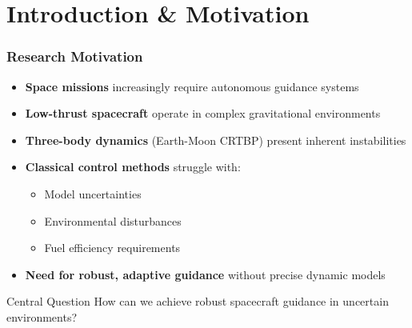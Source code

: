 \section{Introduction \& Motivation}

\begin{frame}
    \frametitle{Research Motivation}
    \vspace{-0.5cm}

    \begin{itemize}
        \item \textbf{Space missions} increasingly require autonomous guidance systems
        \item \textbf{Low-thrust spacecraft} operate in complex gravitational environments
        \item \textbf{Three-body dynamics} (Earth-Moon CRTBP) present inherent instabilities
        \item \textbf{Classical control methods} struggle with:
        \begin{itemize}
            \item Model uncertainties
            \item Environmental disturbances
            \item Fuel efficiency requirements
        \end{itemize}
        \item \textbf{Need for robust, adaptive guidance} without precise dynamic models
    \end{itemize}
    \vspace{-0.1cm}
    
    \begin{minipage}
        {0.83\textwidth}
            \begin{block}{Central Question}
     How can we achieve robust spacecraft guidance in uncertain environments?
    \end{block}
    \end{minipage}
\end{frame}

